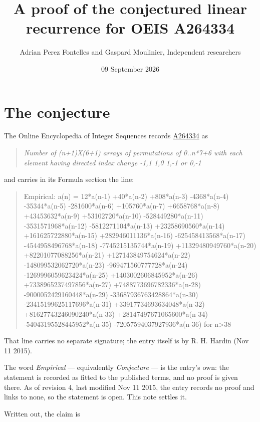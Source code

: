 \documentclass[11pt]{article}
\title{A proof of the conjectured linear recurrence for OEIS A264334}
\author{Adrian Perez Fontelles and Gaspard Moulinier, Independent researchers}
\date{09 September 2026}
\theoremstyle{definition}
\begin{document}
\maketitle
\section{The conjecture}

The Online Encyclopedia of Integer Sequences records \href{https://oeis.org/A264334}{A264334} as

\begin{quote}\itshape Number of (n+1)X(6+1) arrays of permutations of 0..n*7+6 with each element having directed index change -1,1 1,0 1,-1 or 0,-1\end{quote}

and carries in its Formula section the line:

\begin{quote}\ttfamily Empirical: a(n) = 12*a(n-1) +40*a(n-2) +808*a(n-3) -4368*a(n-4) -35344*a(n-5) -281600*a(n-6) +105760*a(n-7) +6658768*a(n-8) +43453632*a(n-9) +53102720*a(n-10) -528449280*a(n-11) -3531571968*a(n-12) -5812271104*a(n-13) +23258690560*a(n-14) +161625722880*a(n-15) +282946011136*a(n-16) -625458413568*a(n-17) -4544958496768*a(n-18) -7745215135744*a(n-19) +11329480949760*a(n-20) +82201077088256*a(n-21) +127143849754624*a(n-22) -148099532062720*a(n-23) -969471560777728*a(n-24) -1269996059623424*a(n-25) +1403002606845952*a(n-26) +7338965237497856*a(n-27) +7488773696782336*a(n-28) -9000052429160448*a(n-29) -33687936763428864*a(n-30) -23415199625117696*a(n-31) +33917734693634048*a(n-32) +81627743246090240*a(n-33) +28147497671065600*a(n-34) -54043195528445952*a(n-35) -72057594037927936*a(n-36) for n>38\end{quote}

That line carries no separate signature; the entry itself is by R. H. Hardin (Nov 11 2015).

The word {\itshape Empirical} --- equivalently {\itshape Conjecture} --- is the entry's own: the statement is recorded as fitted to the published terms, and no proof is given there. As of revision 4, last modified Nov 11 2015, the entry records no proof and links to none, so the statement is open. This note settles it.

Written out, the claim is
\end{document}
